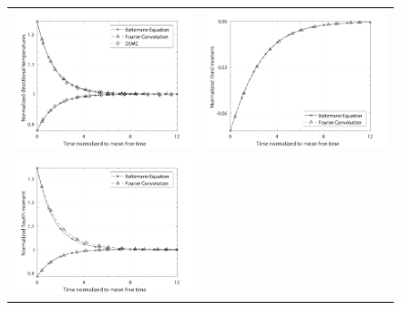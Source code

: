 \documentclass[12pt]{CSUNthesis}
\begin{document}
\begin{center}
\begin{figure}[h]
\centering
  \begin{tabular}{@{}cc@{}}
  \includegraphics[height=.218\textheight]{images/m300_N33_mom2.pdf}&
  \includegraphics[height=.218\textheight]{images/m300_N33_mom3.pdf}\\      
  \includegraphics[height=.218\textheight]{images/m300_N33_mom4.pdf}&

\end{tabular}
\end{figure}
\end{center}
\end{document}

